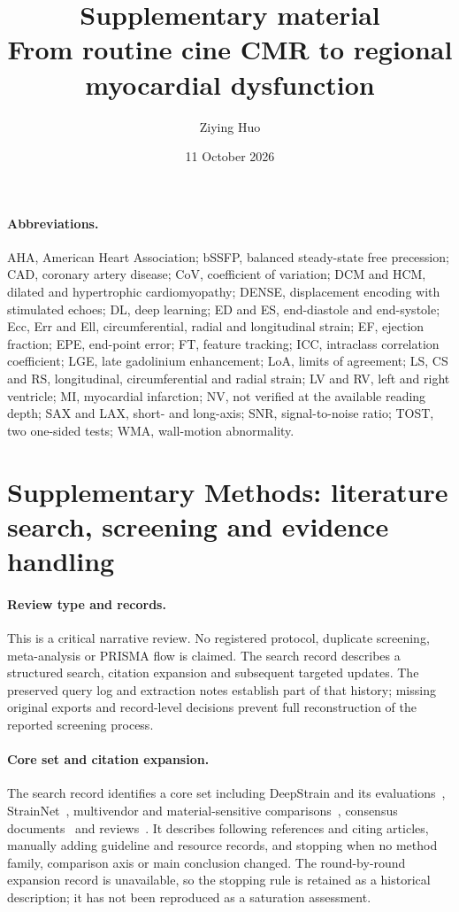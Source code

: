 \documentclass[11pt,a4paper]{article}
\title{\textbf{Supplementary material}\\[0.3em]
\large From routine cine CMR to regional myocardial dysfunction}
\author{Ziying Huo}
\date{11 October 2026}
\begin{document}
\maketitle
\vspace{1.2em}

\paragraph{Abbreviations.} AHA, American Heart Association; bSSFP, balanced steady-state free precession; CAD, coronary artery disease; CoV, coefficient of variation; DCM and HCM, dilated and hypertrophic cardiomyopathy; DENSE, displacement encoding with stimulated echoes; DL, deep learning; ED and ES, end-diastole and end-systole; Ecc, Err and Ell, circumferential, radial and longitudinal strain; EF, ejection fraction; EPE, end-point error; FT, feature tracking; ICC, intraclass correlation coefficient; LGE, late gadolinium enhancement; LoA, limits of agreement; LS, CS and RS, longitudinal, circumferential and radial strain; LV and RV, left and right ventricle; MI, myocardial infarction; NV, not verified at the available reading depth; SAX and LAX, short- and long-axis; SNR, signal-to-noise ratio; TOST, two one-sided tests; WMA, wall-motion abnormality.

\section*{Supplementary Methods: literature search, screening and evidence handling}

\paragraph{Review type and records.} This is a critical narrative review. No registered protocol, duplicate screening, meta-analysis or PRISMA flow is claimed. The search record describes a structured search, citation expansion and subsequent targeted updates. The preserved query log and extraction notes establish part of that history; missing original exports and record-level decisions prevent full reconstruction of the reported screening process.

\paragraph{Core set and citation expansion.} The search record identifies a core set including DeepStrain and its evaluations~\cite{morales2021,morales2022comparison,mrxcat2023}, StrainNet~\cite{wang2023strainnet}, multivendor and material-sensitive comparisons~\cite{militaru2021,cao2018,wehner2018,kihlberg2020clinical}, consensus documents~\cite{voigt2015,puntmann2018,schulzmenger2020,hundley2022} and reviews~\cite{amzulescu2019,duchateau2020,smiseth2025,monfared2026review,hussein2026review}. It describes following references and citing articles, manually adding guideline and resource records, and stopping when no method family, comparison axis or main conclusion changed. The round-by-round expansion record is unavailable, so the stopping rule is retained as a historical description; it has not been reproduced as a saturation assessment.
\end{document}
